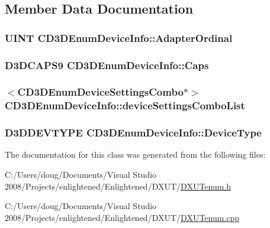 \subsection{Member Data Documentation}
\hypertarget{class_c_d3_d_enum_device_info_a19e791a4b3a5a97ca07ee9b99231aa0a}{
\subsubsection[{AdapterOrdinal}]{\setlength{\rightskip}{0pt plus 5cm}UINT {\bf CD3DEnumDeviceInfo::AdapterOrdinal}}}
\label{class_c_d3_d_enum_device_info_a19e791a4b3a5a97ca07ee9b99231aa0a}
\hypertarget{class_c_d3_d_enum_device_info_a821cf46b5737e0070da582498fde308a}{
\subsubsection[{Caps}]{\setlength{\rightskip}{0pt plus 5cm}D3DCAPS9 {\bf CD3DEnumDeviceInfo::Caps}}}
\label{class_c_d3_d_enum_device_info_a821cf46b5737e0070da582498fde308a}
\hypertarget{class_c_d3_d_enum_device_info_aa6f62fac8ff79d65e58fc40cff37789d}{
\subsubsection[{deviceSettingsComboList}]{$<${\bf CD3DEnumDeviceSettingsCombo}$\ast$$>$ {\bf CD3DEnumDeviceInfo::deviceSettingsComboList}}}
\label{class_c_d3_d_enum_device_info_aa6f62fac8ff79d65e58fc40cff37789d}
\hypertarget{class_c_d3_d_enum_device_info_a4c6d5932313ad036847ef4fdbf5fb927}{
\subsubsection[{DeviceType}]{\setlength{\rightskip}{0pt plus 5cm}D3DDEVTYPE {\bf CD3DEnumDeviceInfo::DeviceType}}}
\label{class_c_d3_d_enum_device_info_a4c6d5932313ad036847ef4fdbf5fb927}


The documentation for this class was generated from the following files:\begin{DoxyCompactItemize}
\item 
C:/Users/doug/Documents/Visual Studio 2008/Projects/enlightened/Enlightened/DXUT/\hyperlink{_d_x_u_tenum_8h}{DXUTenum.h}\item 
C:/Users/doug/Documents/Visual Studio 2008/Projects/enlightened/Enlightened/DXUT/\hyperlink{_d_x_u_tenum_8cpp}{DXUTenum.cpp}\end{DoxyCompactItemize}
